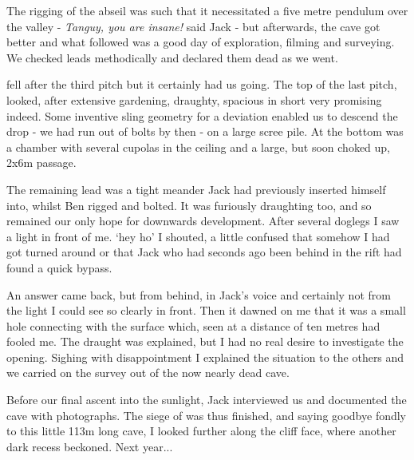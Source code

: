 The rigging of the abseil was such that it necessitated a five metre pendulum over the  valley - \textit{Tanguy, you are insane!} said Jack - but afterwards, the cave got better and what followed was a good day of exploration, filming and surveying. We checked leads methodically and declared them dead as we went. 

\begin{figure*}[t!]
    \centering
    \caption{}
    \label{}
\end{figure*}

 fell after the third pitch but it certainly had us going. The top of the last pitch, looked, after extensive gardening, draughty, spacious in short very promising indeed. Some inventive sling geometry for a deviation enabled us to descend the drop - we had run out of bolts by then -  on a large scree pile.  At the bottom was a chamber with several cupolas in the ceiling and a large, but soon choked up, 2x6m passage. 

The remaining lead was a tight meander Jack had previously inserted himself into, whilst Ben rigged and bolted. It was furiously draughting too, and so remained our only hope for downwards development. After several doglegs I saw a light in front of me. ‘hey ho’ I shouted, a little confused that somehow I had got turned around or that Jack who had seconds ago been behind in the rift had found a quick bypass. 

An answer came back, but from behind, in Jack’s voice and certainly not from the light I could see so clearly in front. Then it dawned on me that it was a small hole connecting with the surface which, seen at a distance of ten metres had fooled me. The draught was explained, but I had no real desire to investigate the opening. Sighing with disappointment I explained the situation to the others and we carried on the survey out of the now nearly dead cave. 

Before our final ascent into the sunlight, Jack interviewed us and documented the cave with photographs. The siege of  was thus finished, and saying goodbye fondly to this little 113m long cave, I looked further along the cliff face, where another dark recess beckoned. Next year...


